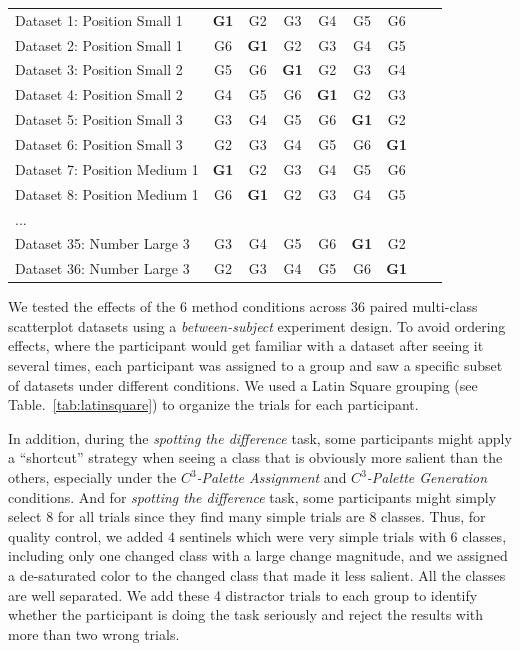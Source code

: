 {\begin{table}[ht]
\begin{tabular}{lcccccccc}
     \hline
     Dataset 1: Position Small 1 & \textbf{G1} & G2 & G3  & G4 & G5 & G6 \\
     Dataset 2: Position Small 1 & G6 & \textbf{G1} & G2 & G3  & G4 & G5 \\
     Dataset 3: Position Small 2 & G5  & G6 & \textbf{G1} & G2 & G3 & G4 \\
     Dataset 4: Position Small 2 & G4 & G5  & G6 & \textbf{G1} & G2 & G3 \\
     Dataset 5: Position Small 3 & G3 & G4 & G5  & G6 & \textbf{G1} & G2 \\
     Dataset 6: Position Small 3 & G2 & G3 & G4  & G5 & G6 & \textbf{G1} \\
     Dataset 7: Position Medium 1 & \textbf{G1} & G2 & G3  & G4 & G5 & G6 \\
     Dataset 8: Position Medium 1 & G6 & \textbf{G1} & G2 & G3  & G4 & G5 \\
     ... & & & & & & &\\
     Dataset 35: Number Large 3 & G3 & G4 & G5  & G6 & \textbf{G1} & G2 \\
     Dataset 36: Number Large 3 & G2 & G3  & G4 & G5 & G6 & \textbf{G1}  \\

     \hline
     \end{tabular}
     \end{table}


\vspace{.3em}
 We tested the effects of the $6$ method conditions across $36$ paired multi-class scatterplot datasets using a \emph{between-subject} experiment design. To avoid ordering effects, where the participant would get familiar with a dataset after seeing it several times, each participant was assigned to a group and saw a specific subset of datasets under different conditions. We used a Latin Square grouping (see Table.~\ref{tab:latinsquare}) to organize the trials for each participant. %

In addition, during the \emph{spotting the difference} task, some participants might apply a ``shortcut'' strategy when seeing a class that is obviously more salient than the others, especially under the \emph{$C^3$-Palette Assignment} and \emph{$C^3$-Palette Generation} conditions.
And for \emph{spotting the difference} task, some participants might simply select 8 for all trials since they find many simple trials are 8 classes.
Thus, for quality control, we added $4$ sentinels which were very simple trials with 6 classes, including only one changed class with a large change magnitude, and we assigned a de-saturated color to the changed class that made it less salient. All the classes are well separated. We add these 4 distractor trials to each group to identify whether the participant is doing the task seriously and reject the results with more than two wrong trials.

}
